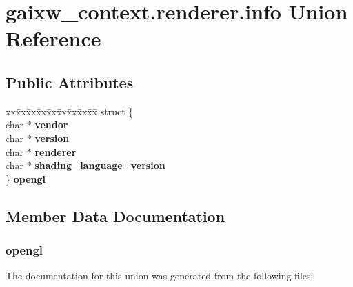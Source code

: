 \hypertarget{uniongaixw__context_8renderer_8info}{}\section{gaixw\+\_\+context.\+renderer.\+info Union Reference}
\label{uniongaixw__context_8renderer_8info}
\subsection*{Public Attributes}
\begin{DoxyCompactItemize}
\item 
\mbox{\label{uniongaixw__context_8renderer_8info_a6785e6b975db5d7cf223101ef1bc2f6f}} 
\begin{tabbing}
xx\=xx\=xx\=xx\=xx\=xx\=xx\=xx\=xx\=\kill
struct \{\\
\mbox{\label{structgaixw__context_1_1_0D6_1_1_0D9_1_1_0D10_a2fb5d2cdf49b39045da8c0eee73ee8ee}} 
char $\ast$ {\bfseries vendor}\\
\mbox{\label{structgaixw__context_1_1_0D6_1_1_0D9_1_1_0D10_a9fac0600a3a7a531e67dcd508112c56e}} 
char $\ast$ {\bfseries version}\\
\mbox{\label{structgaixw__context_1_1_0D6_1_1_0D9_1_1_0D10_a246df9525d37ffd502dc311fb2bf490e}} 
char $\ast$ {\bfseries renderer}\\
\mbox{\label{structgaixw__context_1_1_0D6_1_1_0D9_1_1_0D10_aa9bea20e89c3c8c4278593252c4f7189}} 
char $\ast$ {\bfseries shading\_language\_version}\\
\} {\bfseries opengl}\\

\end{tabbing}\end{DoxyCompactItemize}


\subsection{Member Data Documentation}
\mbox{\label{uniongaixw__context_8renderer_8info_a6785e6b975db5d7cf223101ef1bc2f6f}} 
\subsubsection{\texorpdfstring{opengl}{opengl}}
{\footnotesize\ttfamily }



The documentation for this union was generated from the following files\+: